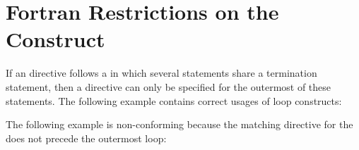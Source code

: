 \pagebreak
\chapter{Fortran Restrictions on the  Construct}
\label{chap:fort_do}
\fortranspecificstart

If an  directive follows a   in which several 
 statements share a  termination statement, then a   
directive can only be specified for the outermost of these  statements. 
The following example contains correct usages of loop constructs:


The following example is non-conforming because the matching  directive 
for the  does not precede the outermost loop:

\fortranspecificend


